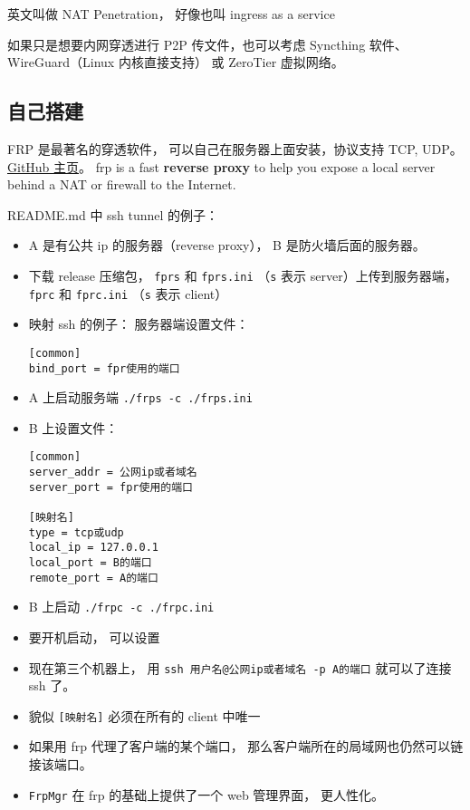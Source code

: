 
\begin{issues}
\issueDraft
\end{issues}

英文叫做 NAT Penetration， 好像也叫 ingress as a service

如果只是想要内网穿透进行 P2P 传文件，也可以考虑 Syncthing 软件、 WireGuard（Linux 内核直接支持） 或 ZeroTier 虚拟网络。

\subsection{自己搭建}
FRP 是最著名的穿透软件， 可以自己在服务器上面安装，协议支持 TCP, UDP。 \href{https://github.com/fatedier/frp}{GitHub 主页}。
frp is a fast \textbf{reverse proxy} to help you expose a local server behind a NAT or firewall to the Internet.

README.md 中 ssh tunnel 的例子：
\begin{itemize}
\item A 是有公共 ip 的服务器（reverse proxy）， B 是防火墙后面的服务器。
\item 下载 release 压缩包， \verb`fprs` 和 \verb`fprs.ini` （\verb`s` 表示 server）上传到服务器端， \verb`fprc` 和 \verb`fprc.ini` （\verb`s` 表示 client）
\item 映射 ssh 的例子： 服务器端设置文件：
\begin{lstlisting}[language=none,caption=fprs.ini]
[common]
bind_port = fpr使用的端口
\end{lstlisting}
\item A 上启动服务端 \verb`./frps -c ./frps.ini`
\item B 上设置文件：
\begin{lstlisting}[language=none,caption=fprc.ini]
[common]
server_addr = 公网ip或者域名
server_port = fpr使用的端口

[映射名]
type = tcp或udp
local_ip = 127.0.0.1
local_port = B的端口
remote_port = A的端口
\end{lstlisting}
\item B 上启动 \verb`./frpc -c ./frpc.ini`
\item 要开机启动， 可以设置 
\item 现在第三个机器上， 用 \verb`ssh 用户名@公网ip或者域名 -p A的端口` 就可以了连接 ssh 了。
\item 貌似 \verb`[映射名]` 必须在所有的 client 中唯一
\item 如果用 frp 代理了客户端的某个端口， 那么客户端所在的局域网也仍然可以链接该端口。
\item \verb`FrpMgr` 在 frp 的基础上提供了一个 web 管理界面， 更人性化。
\end{itemize}

